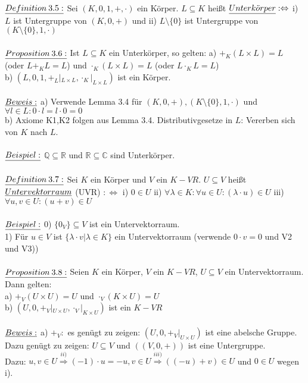 \documentclass[fleqn, a4paper, 11pt]{article}
\begin{document}
\\
$\uline{Definition\:3.5:}$ Sei $(K,0,1,+,\cdot)$ ein K\"orper. $L\subseteq K$ hei\ss{}t $\uline{Unterk\ddot{o}rper}:\Leftrightarrow$ i) $L$ ist Untergruppe von $(K,0,+)$ und ii) $L\setminus\{0\}$ ist Untergruppe von $(K\setminus\{0\},1,\cdot)$\\
\\
$\uline{Proposition\:3.6:}$ Ist $L\subseteq K$ ein Unterk\"orper, so gelten: a) $+_{K}(L\times L)=L$ (oder $L+_{K}L=L$) und $\cdot_{K}(L\times L)=L$ (oder $L\cdot_{K} L=L$)\\
b) $(L,0,1,+_{L}|_{L\times L},\cdot_{K}|_{L\times L})$ ist ein K\"orper.\\
\\
$\uline{Beweis:}$ a) Verwende Lemma 3.4 f\"ur $(K,0,+),(K\setminus\{0\},1,\cdot)$ und $\forall l\in L:0\cdot l=l\cdot 0=0$\\
b) Axiome K1,K2 folgen aus Lemma 3.4. Distributivgesetze in $L$: Vererben sich von $K$ nach $L$.\\
\\
$\uline{Beispiel:}$ $\mathbb{Q}\subseteq\mathbb{R}$ und $\mathbb{R}\subseteq\mathbb{C}$ sind Unterk\"orper.\\
\\
$\uline{Definition\:3.7:}$ Sei $K$ ein K\"orper und $V$ ein $K-VR$. $U\subseteq V$ hei\ss{}t $\uline{Untervektorraum}$ (UVR) $:\Leftrightarrow$ i) $0\in U$ ii) $\forall\lambda\in K:\forall u\in U:(\lambda\cdot u)\in U$ iii) $\forall u,v\in U:(u+v)\in U$\\
\\
$\uline{Beispiel:}$ 0) $\{0_{V}\}\subseteq V$ ist ein Untervektorraum.\\
1) F\"ur $u\in V$ ist $\{\lambda\cdot v|\lambda\in K\}$ ein Untervektorraum (verwende $0\cdot v=0$ und V2 und V3))\\
\\
$\uline{Proposition\:3.8:}$ Seien $K$ ein K\"orper, $V$ ein $K-VR$, $U\subseteq V$ ein Untervektorraum. Dann gelten:\\
a) $+_{V}(U\times U)=U$ und $\cdot_{V}(K\times U)=U$\\
b) $(U,0,+_{V}|_{U\times U},\cdot_{V}|_{K\times U})$ ist ein $K-VR$\\
\\
$\uline{Beweis:}$ a) $+_{V}:$ es gen\"ugt zu zeigen: $(U,0,+_{V}|_{U\times U})$ ist eine abelsche Gruppe. Dazu gen\"ugt zu zeigen: $U\subseteq V$ und $((V,0,+))$ ist eine Untergruppe.\\
Dazu: $u,v\in U\stackrel{ii)}{\Rightarrow}(-1)\cdot u=-u,v\in U\stackrel{iii)}{\Rightarrow}((-u)+v)\in U$ und $0\in U$ wegen i).\\
\end{document}

